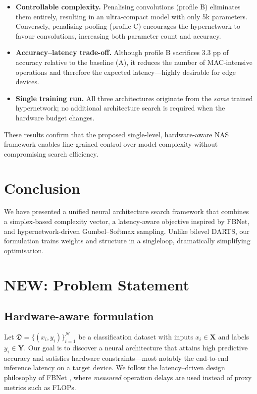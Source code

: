 \documentclass{article}
\begin{document}
\begin{itemize}
    \item \textbf{Controllable complexity.}  
    Penalising convolutions (profile B) eliminates them entirely, resulting in    an ultra-compact model with only 5k parameters.
    Conversely, penalising pooling (profile C) encourages the hypernetwork
    to favour convolutions, increasing both parameter count and accuracy.
    \item \textbf{Accuracy–latency trade-off.}  
    Although profile B sacrifices 3.3 pp of accuracy relative to the baseline
    (A), it reduces the number of MAC-intensive operations and therefore the
    expected latency—highly desirable for edge devices.
    \item \textbf{Single training run.}  
    All three architectures originate from the \emph{same} trained
    hypernetwork; no additional architecture search is required when the
    hardware budget changes.
\end{itemize}

These results confirm that the proposed single-level, hardware-aware NAS framework enables fine-grained control over model complexity without compromising search efficiency.


\section{Conclusion}


We have presented a unified neural architecture search framework that
combines a simplex-based complexity vector,
a latency-aware objective inspired by FBNet, and
hypernetwork-driven Gumbel–Softmax sampling.
Unlike bilevel DARTS, our formulation trains weights and structure in a singleloop, dramatically simplifying optimisation.



\section{NEW: Problem Statement}

\subsection{Hardware-aware formulation}

Let $\mathfrak D=\{(x_i,y_i)\}_{i=1}^{\mathcal N}$ be a classification dataset with inputs $x_i\in\mathbf X$ and labels $y_i\in\mathbf Y$.  
Our goal is to discover a neural architecture that attains high predictive accuracy and satisfies hardware constraints—most notably the end-to-end inference latency on a target device. We follow the latency–driven design philosophy of FBNet \cite{Wu_2019_CVPR}, where \textit{measured} operation delays are used instead of proxy metrics such as FLOPs.
\end{document}

